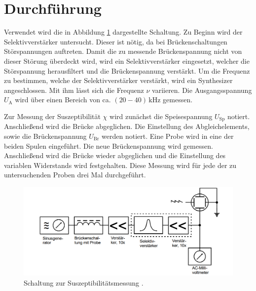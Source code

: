 \section{Durchführung}
\label{sec:Durchführung}
Verwendet wird die in Abbildung \ref{fig:schaltung2} dargestellte Schaltung. Zu Beginn wird der
Selektivverstärker untersucht. Dieser ist nötig, da bei Brückenschaltungen Störspannungen auftreten.
Damit die zu messende Brückenspannung nicht von dieser Störung überdeckt wird, wird ein
Selektivverstärker eingesetzt, welcher die Störspannung herausfiltert und die Brückenspannung
verstärkt. Um die Frequenz zu bestimmen, welche der Selektivverstärker verstärkt, wird ein
Synthesizer angeschlossen. Mit ihm lässt sich die Frequenz $\nu$ variieren. Die Ausgangsspannung
$U_\text{A}$ wird über einen Bereich von ca. $(20-40)\,\si{\kilo\hertz}$ gemessen.

\noindent Zur Messung der Suszeptibilität $\chi$ wird zunächst die Speisespannung $U_\text{Sp}$
notiert. Anschließend wird die Brücke abgeglichen. Die Einstellung des Abgleichelements, sowie die
Brückenspannung $U_\text{Br}$ werden notiert. Eine Probe wird in eine der beiden Spulen eingeführt.
Die neue Brückenspannung wird gemessen. Anschließend wird die Brücke wieder abgeglichen und die
Einstellung des variablen Widerstands wird festgehalten. Diese Messung wird für jede der zu
untersuchenden Proben drei Mal durchgeführt.

\begin{figure}[H]
\centering
\includegraphics[scale=0.8]{schaltung2.png}
\caption{Schaltung zur Suszeptibilitätsmessung \cite{kent}.}
\label{fig:schaltung2}
\end{figure}
